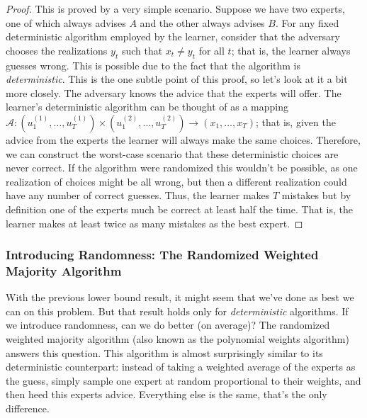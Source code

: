 \documentclass[12pt]{article}
\begin{document}
\begin{proof}
This is proved by a very simple scenario. Suppose we have two experts, one of which always advises $A$ and the other always advises $B$. For any fixed deterministic algorithm employed by the 
learner, consider that the adversary chooses the realizations $y_t$ such that $x_t \neq y_t$ for all $t$; that is, the learner always guesses wrong. This is possible due to the fact that the algorithm
is \textit{deterministic}. This is the one subtle point of this proof, so let's look at it a bit more closely. The adversary knows the advice that the experts will offer. The learner's deterministic algorithm 
can be thought of as a mapping $\mathcal{A}: (u_1^{(1)}, \dots, u_T^{(1)}) \times (u_1^{(2)}, \dots, u_T^{(2)}) \to (x_1, \dots, x_T)$; that is, given the advice from the experts the learner will 
always make the same choices. Therefore, we can construct the worst-case scenario that these deterministic choices are never correct. If the algorithm were randomized this wouldn't be possible,
as one realization of choices might be all wrong, but then a different realization could have any number of correct guesses. 
Thus, the learner makes $T$ mistakes but by definition one of the experts much be correct at least half the time. That is, the learner makes at least twice as many mistakes as the best expert.    
\end{proof}

\subsubsection{Introducing Randomness: The Randomized Weighted Majority Algorithm}
With the previous lower bound result, it might seem that we've done as best we can on this problem. But that result holds only for \textit{deterministic} algorithms. If we introduce randomness, 
can we do better (on average)? The randomized weighted majority algorithm (also known as the polynomial weights algorithm) answers this question. This algorithm is almost surprisingly 
similar to its deterministic counterpart: instead of taking a weighted average of the experts as the guess, simply sample one expert at random proportional to their weights, and then heed
this experts advice. Everything else is the same, that's the only difference. 
\end{document}
